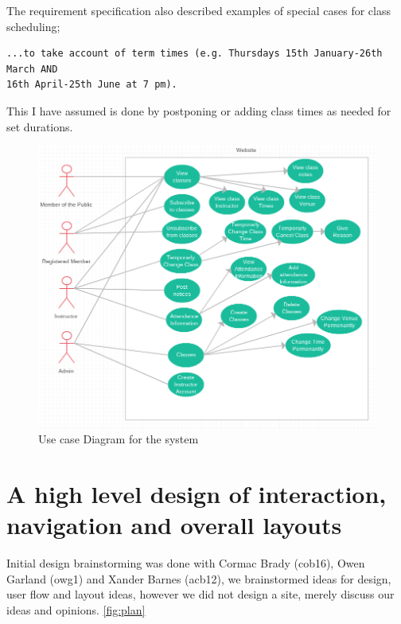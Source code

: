 \documentclass[10pt]{article}
\begin{document}
    The requirement specification also described examples of special cases for class scheduling;
    \begin{verbatim}
...to take account of term times (e.g. Thursdays 15th January-26th March AND
16th April-25th June at 7 pm).
    \end{verbatim}

    This I have assumed is done by postponing or adding class times as needed for set durations.

    \begin{figure}[p]
      \centering
      \includegraphics[width=1\textwidth]{usecasediagram.png}
      \caption{Use case Diagram for the system}
      \label{fig:usecase}
    \end{figure}

    \section{A high level design of interaction, navigation and overall layouts}
      Initial design brainstorming was done with Cormac Brady (cob16), Owen Garland (owg1) and Xander Barnes (acb12), we brainstormed ideas for design, user flow and layout ideas, however we did not design a site, merely discuss our ideas and opinions. \ref{fig:plan}
\end{document}
